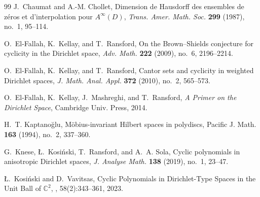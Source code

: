 \documentclass[a4paper,12pt]{amsart}
\theoremstyle{definition}
\begin{document}
\begin{thebibliography}{99}
J.~Chaumat and A.-M. Chollet,
\newblock Dimension de {H}ausdorff des ensembles de zéros et d'interpolation pour $A^\infty(D)$,
\newblock \emph{Trans. Amer. Math. Soc.} \textbf{299} (1987), no.~1, 95--114.


O.~El-Fallah, K.~Kellay, and T.~Ransford,
\newblock On the {Brown--Shields} conjecture for cyclicity in the {Dirichlet} space,
\newblock \emph{Adv. Math.} \textbf{222} (2009), no.~6, 2196--2214.

O.~El-Fallah, K.~Kellay, and T.~Ransford,
\newblock Cantor sets and cyclicity in weighted {Dirichlet} spaces,
\newblock \emph{J. Math. Anal. Appl.} \textbf{372} (2010), no.~2, 565--573.

O.~El-Fallah, K.~Kellay, J.~Mashreghi, and T.~Ransford,
\newblock \emph{A Primer on the {Dirichlet} Space},
\newblock Cambridge Univ. Press, 2014.




H.~T. Kaptano\u{g}lu,
M\"obius-invariant Hilbert spaces in polydiscs,
Pacific J. Math. \textbf{163} (1994), no.~2, 337--360.

G.~Knese, Ł.~Kosiński, T.~Ransford, and A.~A. Sola,
\newblock Cyclic polynomials in anisotropic {Dirichlet} spaces,
\newblock \emph{J. Analyse Math.} \textbf{138} (2019), no.~1, 23--47.

Ł.~Kosiński and D.~Vavitsas,
\newblock Cyclic Polynomials in Dirichlet-Type Spaces in the Unit Ball of \(\mathbb{C}^2\),
, 58(2):343–361, 2023.




\end{thebibliography}
\end{document}

